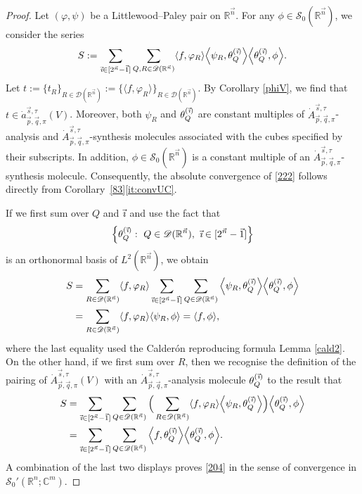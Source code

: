 \documentclass[11pt, reqno]{amsart}
\theoremstyle{definition}
\theoremstyle{remark}
\numberwithin{equation}{section}
\newcommand{\R}{\mathbb R}
\newcommand{\vi}{\vec{\textit{\i}}}
\newcommand{\vn}{\vec n}
\begin{document}
\begin{proof}
Let $(\varphi,\psi)$ be a Littlewood--Paley pair on $\R^{\vn}$.
For any $\phi\in\mathscr{S}_0(\mathbb R^{\vec n})$, we consider the series
\begin{align}\label{222}
S:= \sum_{\vi\in[2^{\vn}-\vec1]}
\sum_{Q,R\in\mathscr{D}(\mathbb R^{\vec n})}
\langle f,\varphi_R\rangle
\Big\langle\psi_R,\theta^{(\vi)}_Q\Big\rangle
\Big\langle\theta^{(\vi)}_Q,\phi\Big\rangle.
\end{align}
Let $t:=\{t_R\}_{R\in\mathscr{D}(\mathbb R^{\vec n})}
:=\{\langle f,\varphi_R\rangle\}_{R\in\mathscr{D}(\mathbb R^{\vec n})}$.
By Corollary \ref{phiV}, we find that $t\in \dot a^{\vec s,\tau}_{\vec p,\vec q,\pi}(V)$.
Moreover, both $\psi_R$ and $\theta_Q^{(\vi)}$ are constant multiples of
$\dot A^{\vec s,\tau}_{\vec p,\vec q,\pi}$-analysis
and $\dot A^{\vec s,\tau}_{\vec p,\vec q,\pi}$-synthesis molecules
associated with the cubes specified by their subscripts.
In addition, $\phi\in\mathscr{S}_0(\mathbb R^{\vec n})$ is
a constant multiple of an $\dot A^{\vec s,\tau}_{\vec p,\vec q,\pi}$-synthesis
molecule. Consequently, the absolute convergence of \eqref{222}
follows directly from Corollary~\ref{83}\eqref{it:convUC}.

If we first sum over $Q$ and $\vi$ and use the fact that
$$
\Big\{\theta_Q^{(\vi)}:\ Q\in\mathscr D(\mathbb R^{\vec n}),\
\vi\in[2^{\vn}-\vec1]\Big\}
$$
is an orthonormal basis of $L^2(\mathbb R^{\vec n})$, we obtain
\begin{align*}
S&=\sum_{R\in\mathscr D(\mathbb R^{\vec n})}
\langle f,\varphi_R\rangle
\sum_{\vi\in[2^{\vn}-\vec1]}
\sum_{Q\in\mathscr D(\mathbb R^{\vec n})}
\Big\langle\psi_R,\theta^{(\vi)}_Q\Big\rangle
\Big\langle\theta^{(\vi)}_Q,\phi\Big\rangle\\
&=\sum_{R\in\mathscr D(\mathbb R^{\vec n})}
\langle f,\varphi_R\rangle
\langle\psi_R,\phi\rangle
=\langle f,\phi\rangle,
\end{align*}
where the last equality used the Calder\'on reproducing formula
Lemma \ref{cald2}.
On the other hand, if we first sum over $R$,
then we recognise the definition of the pairing of $\dot A^{\vec s,\tau}_{\vec p,\vec q,\pi}(V)$
with an $\dot A^{\vec s,\tau}_{\vec p,\vec q,\pi}$-analysis molecule $\theta^{(\vi)}_Q$ to the result that
\begin{align*}
S
&=\sum_{\vi\in[2^{\vn}-\vec1]}
\sum_{Q\in\mathscr D(\mathbb R^{\vec n})}
\Big(\sum_{R\in\mathscr D(\mathbb R^{\vec n})}
\langle f,\varphi_R\rangle  \Big\langle\psi_R,\theta^{(\vi)}_Q\Big\rangle\Big)
\Big\langle\theta^{(\vi)}_Q,\phi\Big\rangle\\
&=\sum_{\vi\in[2^{\vn}-\vec1]}
\sum_{Q\in\mathscr D(\mathbb R^{\vec n})}
\Big\langle f,\theta^{(\vi)}_Q\Big\rangle  \Big\langle\theta^{(\vi)}_Q,\phi\Big\rangle.
\end{align*}
A combination of the last two displays proves \eqref{204} in the sense of
convergence in $\mathscr{S}_0'(\mathbb R^n;\mathbb C^m)$.


\end{proof}
\end{document}
